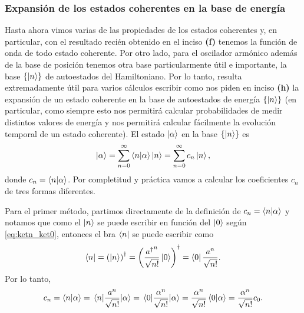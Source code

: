 \documentclass[10pt, a4paper]{article}
\numberwithin{equation}{subsection}
\begin{document}
\subsubsection{Expansión de los estados coherentes en la base de energía}

Hasta ahora vimos varias de las propiedades de los estados coherentes y, en
particular, con el resultado recién obtenido en el inciso \textbf{(f)} tenemos
la función de onda de todo estado coherente. Por otro lado, para el oscilador
armónico además de la base de posición tenemos otra base particularmente útil
e importante, la base $\set{\ket{n}}$ de autoestados del Hamiltoniano. Por lo
tanto, resulta extremadamente útil para varios cálculos escribir como nos piden
en inciso \textbf{(h)} la expansión de un estado coherente en la base de
autoestados de energía $\set{\ket{n}}$ (en particular, como siempre esto nos
permitirá calcular probabilidades de medir distintos valores de energía y nos
permitirá calcular fácilmente la evolución temporal de un estado coherente).
El estado $\ket{\alpha}$ en la base $\set{\ket{n}}$ es
\begin{equation}
  \ket{\alpha} = \sum_{n=0}^{\infty} \braket{n}{\alpha} \ket{n}
    = \sum_{n=0}^{\infty} c_n \ket{n},
\end{equation}
donde $c_n = \braket{n}{\alpha}$. Por completitud y práctica vamos a calcular
los coeficientes $c_n$ de tres formas diferentes.

\bigbreak

Para el primer método, partimos directamente de la definición de $c_n =
\braket{n}{\alpha}$ y notamos que como el $\ket{n}$ se puede escribir en
función del $\ket{0}$ según \eqref{eq:ketn_ket0}, entonces el bra $\bra{n}$ se
puede escribir como
\begin{equation}
  \bra{n} = \left(\ket{n}\right)^\dagger =
  \left(\frac{{a^\dagger}^n}{\sqrt{n!}}\ket{0}\right)^\dagger =
  \bra{0}\frac{a^n}{\sqrt{n!}}.
\end{equation}
Por lo tanto,
\begin{equation} \label{eq:alpha_cn_c0}
  c_n = \braket{n}{\alpha} = \matrixel{n}{\frac{a^n}{\sqrt{n!}}}{\alpha}
    = \matrixel{0}{\frac{\alpha^n}{\sqrt{n!}}}{\alpha} =
    \frac{\alpha^n}{\sqrt{n!}}\braket{0}{\alpha} =
    \frac{\alpha^n}{\sqrt{n!}}c_0.
\end{equation}

\end{document}
